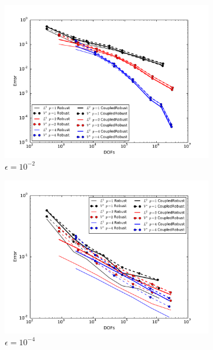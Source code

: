 \documentclass{article}
\theoremstyle{definition}
\theoremstyle{remark}
\begin{document}
\begin{figure}[ht]
\centering
\begin{subfigure}[t]{0.45\textwidth}
\centering
\includegraphics[width=\textwidth]{Confusion/Robustness/convergence_epsilon=1e-2.pdf}
\caption{$\epsilon=10^{-2}$}
\end{subfigure}
\begin{subfigure}[t]{0.45\textwidth}
\centering
\includegraphics[width=\textwidth]{Confusion/Robustness/convergence_epsilon=1e-4.pdf}
\caption{$\epsilon=10^{-4}$}
\end{subfigure}
\begin{subfigure}[t]{0.45\textwidth}
\centering

\end{subfigure}
\end{figure}
\end{document}
